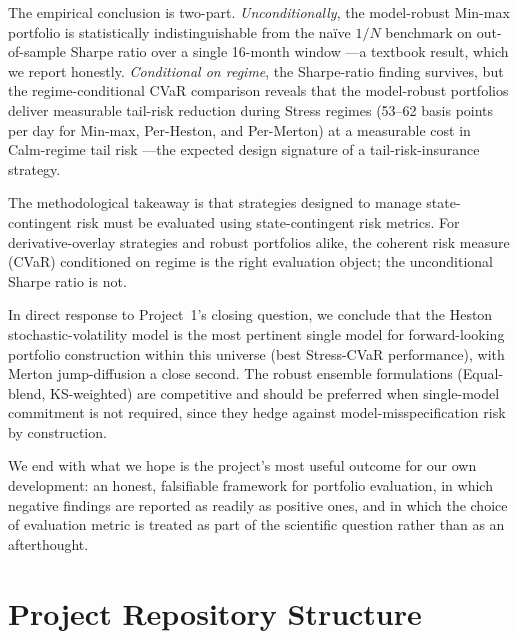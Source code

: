 \documentclass[11pt,letterpaper]{article}
\begin{document}
The empirical conclusion is two-part. \emph{Unconditionally}, the model-robust Min-max portfolio is statistically indistinguishable from the naïve $1/N$ benchmark on out-of-sample Sharpe ratio over a single 16-month window —a textbook \citet{demiguel2009optimal} result, which we report honestly. \emph{Conditional on regime}, the Sharpe-ratio finding survives, but the regime-conditional CVaR comparison reveals that the model-robust portfolios deliver measurable tail-risk reduction during Stress regimes (53–62 basis points per day for Min-max, Per-Heston, and Per-Merton) at a measurable cost in Calm-regime tail risk —the expected design signature of a tail-risk-insurance strategy.

The methodological takeaway is that strategies designed to manage state-contingent risk must be evaluated using state-contingent risk metrics. For derivative-overlay strategies and robust portfolios alike, the coherent risk measure (CVaR) conditioned on regime is the right evaluation object; the unconditional Sharpe ratio is not.

In direct response to Project~1's closing question, we conclude that the Heston stochastic-volatility model is the most pertinent single model for forward-looking portfolio construction within this universe (best Stress-CVaR performance), with Merton jump-diffusion a close second. The robust ensemble formulations (Equal-blend, KS-weighted) are competitive and should be preferred when single-model commitment is not required, since they hedge against model-misspecification risk by construction.

We end with what we hope is the project's most useful outcome for our own development: an honest, falsifiable framework for portfolio evaluation, in which negative findings are reported as readily as positive ones, and in which the choice of evaluation metric is treated as part of the scientific question rather than as an afterthought.




\appendix

\section{Project Repository Structure}
\end{document}
